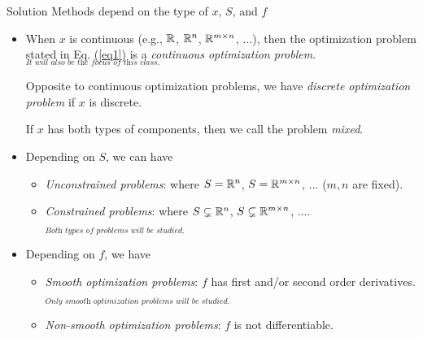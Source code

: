 \begin{df}{Solution Methods depend on the type of $x$, $S$, and $f$}
	\begin{itemize}
		\item When $x$ is continuous (e.g., ${\mathbb{R}}$, ${\mathbb{R}}^n$, ${\mathbb{R}}^{m\times n}$, $\dots$), then the optimization problem stated in Eq. (\ref{eq1}) is a \textit{continuous optimization problem}. $_\textit{It will also be the focus of this class.}$ \par Opposite to continuous optimization problems, we have \textit{discrete optimization problem} if $x$ is discrete. \par If $x$ has both types of components, then we call the problem \textit{mixed}.
		\item Depending on $S$, we can have 
		\begin{itemize}
			\item \textit{Unconstrained problems}: where $S={\mathbb{R}}^n$, $S={\mathbb{R}}^{m\times n}$, $\dots$ ($m,n$ are fixed).
			\item \textit{Constrained problems}: where $S\subsetneq{\mathbb{R}}^n$, $S\subsetneq{\mathbb{R}}^{m\times n}$, $\dots$. \par $_\textit{Both types of problems will be studied.}$
		\end{itemize}
		\item Depending on $f$, we have 
		\begin{itemize}
			\item \textit{Smooth optimization problems}: $f$ has first and/or second order derivatives. \par $_\textit{Only smooth optimization problems will be studied.}$
			\item \textit{Non-smooth optimization problems}: $f$ is not differentiable. 
		\end{itemize}
	\end{itemize}	
\end{df}

